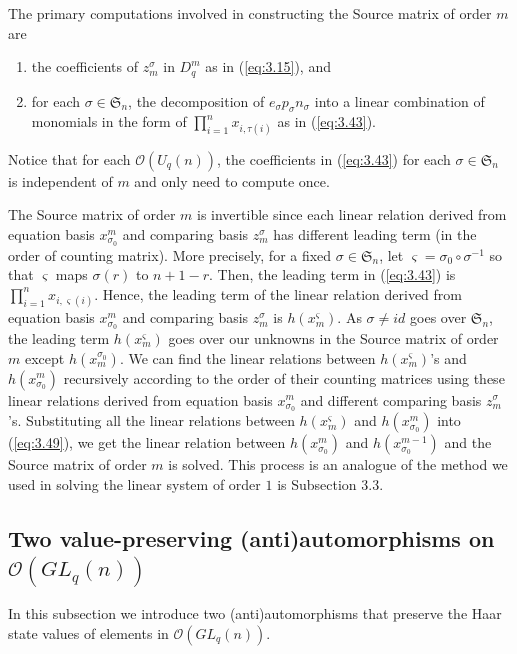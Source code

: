 \documentclass[table,a4paper,reqno]{amsart}
\numberwithin{equation}{section}
\theoremstyle{definition}
\begin{document}
The primary computations involved in constructing the Source matrix of order $m$ are
\begin{enumerate}
    \item[1] the coefficients of $z_m^\sigma$ in $D_q^m$ as in (\ref{eq:3.15}), and
    \item[2]  for each $\sigma\in\mathfrak{S}_n$, the decomposition of $e_\sigma p_\sigma n_\sigma$ into a linear combination of monomials in the form of $\prod_{i=1}^nx_{i,\tau(i)}$ as in (\ref{eq:3.43}). 
\end{enumerate}
Notice that for each $\mathcal{O}(U_q(n))$, the coefficients in (\ref{eq:3.43}) for each $\sigma\in\mathfrak{S}_n$ is independent of $m$ and only need to compute once. 

The Source matrix of order $m$ is invertible since each linear relation derived from equation basis $x^m_{\sigma_0}$ and comparing basis $z_m^\sigma$ has different leading term (in the order of counting matrix). More precisely, for a fixed $\sigma\in\mathfrak{S}_n$, let $\varsigma=\sigma_0\circ\sigma^{-1}$ so that $\varsigma$ maps $\sigma(r)$ to $n+1-r$. Then, the leading term in (\ref{eq:3.43}) is $\prod_{i=1}^nx_{i,\varsigma(i)}$. Hence, the leading term of the linear relation derived from equation basis $x^m_{\sigma_0}$ and comparing basis $z_m^\sigma$ is $h(x_m^\varsigma)$. As $\sigma\ne id$ goes over $\mathfrak{S}_n$, the leading term $h(x_m^\varsigma)$ goes over our unknowns in the Source matrix of order $m$ except $h(x_m^{\sigma_0})$. We can find the linear relations between $h(x_m^\varsigma)$'s and $h(x^m_{\sigma_0})$ recursively according to the order of their counting matrices using these linear relations derived from equation basis $x^m_{\sigma_0}$ and different comparing basis $z_m^\sigma$'s. Substituting all the linear relations between $h(x_m^\varsigma)$ and $h(x^m_{\sigma_0})$ into (\ref{eq:3.49}), we get the linear relation between $h(x^m_{\sigma_0})$ and $h(x^{m-1}_{\sigma_0})$ and the Source matrix of order $m$ is solved. This process is an analogue of the method we used in solving the linear system of order $1$ is Subsection 3.3.

\subsection{Two value-preserving (anti)automorphisms on $\mathcal{O}(GL_q(n))$}
In this subsection we introduce two (anti)automorphisms that preserve the Haar state values of elements in $\mathcal{O}(GL_q(n))$.
\end{document}
